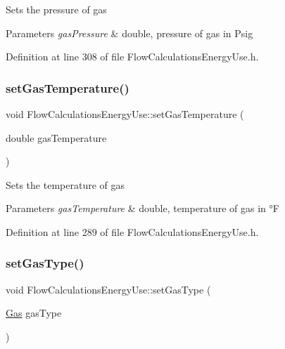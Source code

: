 Sets the pressure of gas


\begin{DoxyParams}{Parameters}
{\em gas\+Pressure} & double, pressure of gas in Psig \\
\hline
\end{DoxyParams}


Definition at line 308 of file Flow\+Calculations\+Energy\+Use.\+h.

\mbox{\label{class_flow_calculations_energy_use_a80db5465d8a0354da31a7f90c759ea1f}} 
\subsubsection{\texorpdfstring{set\+Gas\+Temperature()}{setGasTemperature()}}
{\footnotesize\ttfamily void Flow\+Calculations\+Energy\+Use\+::set\+Gas\+Temperature (\begin{DoxyParamCaption}\item[{double}]{gas\+Temperature }\end{DoxyParamCaption})\hspace{0.3cm}{\ttfamily [inline]}}

Sets the temperature of gas


\begin{DoxyParams}{Parameters}
{\em gas\+Temperature} & double, temperature of gas in °F \\
\hline
\end{DoxyParams}


Definition at line 289 of file Flow\+Calculations\+Energy\+Use.\+h.

\mbox{\label{class_flow_calculations_energy_use_a01b38762426c50e6ab22aefd674f30df}} 
\subsubsection{\texorpdfstring{set\+Gas\+Type()}{setGasType()}}
{\footnotesize\ttfamily void Flow\+Calculations\+Energy\+Use\+::set\+Gas\+Type (\begin{DoxyParamCaption}\item[{\hyperlink{class_flow_calculations_energy_use_a840d5a836e7b05d6791b79bace4440f2}{Gas}}]{gas\+Type }\end{DoxyParamCaption})\hspace{0.3cm}{\ttfamily [inline]}}

